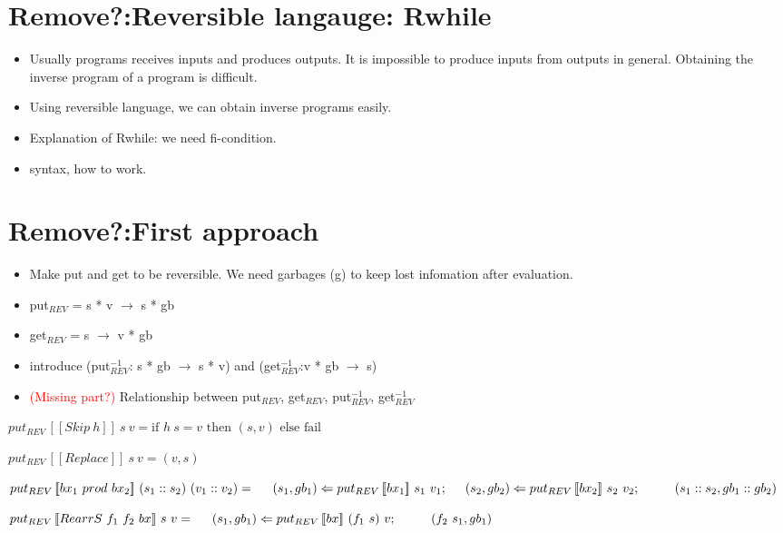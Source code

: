 \documentclass[runningheads]{llncs}
\newcommand{\tab}{\hspace*{5mm}}
\newcommand{\qtab}{\hspace*{5mm} \ \quad}
\newcommand{\sif}[3]{\text{if } #1 \text{ then } #2 \text{ else } #3}
\newcommand{\product}[2]{#1 \ prod \ #2}
\newcommand{\rearrs}[3]{RearrS \ #1 \ #2 \ #3}
\newcommand{\putrev}[3]{put_{REV} \, [\![#1]\!] \ {#2} \ {#3}}
\begin{document}
\section{Remove?:Reversible langauge: Rwhile}


\begin{itemize}
\item Usually programs receives inputs and produces outputs. It is impossible to produce inputs from outputs in general. Obtaining the inverse program of a program is difficult.
\item Using reversible language, we can obtain inverse programs easily.
\item Explanation of Rwhile: we need fi-condition.
\item syntax, how to work.
\end{itemize}

\section{Remove?:First approach}


\begin{itemize}
\item Make put and get to be reversible. We need garbages (g) to keep lost infomation after evaluation.
\item put$_{REV}$ = s * v $\to$ s * gb
\item get$_{REV}$ = s $\to$ v * gb
\item introduce (put$_{REV}^{-1}$: s * gb $\to$ s * v) and (get$_{REV}^{-1}$:v * gb $\to$ s)
\item \textcolor{red}{(Missing part?)} Relationship between put$_{REV}$, get$_{REV}$, put$_{REV}^{-1}$, get$_{REV}^{-1}$ 
\end{itemize}

$\putrev{Skip \ h}{s}{v} =  \sif{h \ s = v}{(s, v)}{\text{fail}}$

$\putrev{Replace}{s}{v} = (v, s)$

$\putrev{\product{bx_1}{bx_2}}{(s_1 :: s_2)}{(v_1 :: v_2)} =\\
    \tab (s_1, gb_1) \Leftarrow \putrev{bx_1}{s_1}{v_1};\\
    \tab (s_2, gb_2) \Leftarrow \putrev{bx_2}{s_2}{v_2};\\
        \qtab (s_1 :: s_2, gb_1 :: gb_2)$

$\putrev{\rearrs{f_1}{f_2}{bx}}{s}{v} =\\
    \tab (s_1, gb_1) \Leftarrow \putrev{bx}{(f_1 \ s)}{v};\\
        \qtab (f_2 \ s_1, gb_1)$
\end{document}
